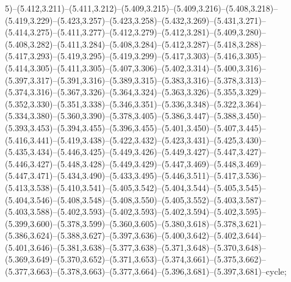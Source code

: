 5)--(5.412,3.211)--(5.411,3.212)--(5.409,3.215)--(5.409,3.216)--(5.408,3.218)--(5.419,3.229)--(5.423,3.257)--(5.423,3.258)--(5.432,3.269)--(5.431,3.271)--(5.414,3.275)--(5.411,3.277)--(5.412,3.279)--(5.412,3.281)--(5.409,3.280)--(5.408,3.282)--(5.411,3.284)--(5.408,3.284)--(5.412,3.287)--(5.418,3.288)--(5.417,3.293)--(5.419,3.295)--(5.419,3.299)--(5.417,3.303)--(5.416,3.305)--(5.414,3.305)--(5.411,3.305)--(5.407,3.306)--(5.402,3.314)--(5.400,3.316)--(5.397,3.317)--(5.391,3.316)--(5.389,3.315)--(5.383,3.316)--(5.378,3.313)--(5.374,3.316)--(5.367,3.326)--(5.364,3.324)--(5.363,3.326)--(5.355,3.329)--(5.352,3.330)--(5.351,3.338)--(5.346,3.351)--(5.336,3.348)--(5.322,3.364)--(5.334,3.380)--(5.360,3.390)--(5.378,3.405)--(5.386,3.447)--(5.388,3.450)--(5.393,3.453)--(5.394,3.455)--(5.396,3.455)--(5.401,3.450)--(5.407,3.445)--(5.416,3.441)--(5.419,3.438)--(5.422,3.432)--(5.423,3.431)--(5.425,3.430)--(5.435,3.434)--(5.446,3.425)--(5.449,3.426)--(5.449,3.427)--(5.447,3.427)--(5.446,3.427)--(5.448,3.428)--(5.449,3.429)--(5.447,3.469)--(5.448,3.469)--(5.447,3.471)--(5.434,3.490)--(5.433,3.495)--(5.446,3.511)--(5.417,3.536)--(5.413,3.538)--(5.410,3.541)--(5.405,3.542)--(5.404,3.544)--(5.405,3.545)--(5.404,3.546)--(5.408,3.548)--(5.408,3.550)--(5.405,3.552)--(5.403,3.587)--(5.403,3.588)--(5.402,3.593)--(5.402,3.593)--(5.402,3.594)--(5.402,3.595)--(5.399,3.600)--(5.378,3.599)--(5.360,3.605)--(5.380,3.618)--(5.378,3.621)--(5.386,3.624)--(5.388,3.627)--(5.397,3.636)--(5.400,3.642)--(5.402,3.644)--(5.401,3.646)--(5.381,3.638)--(5.377,3.638)--(5.371,3.648)--(5.370,3.648)--(5.369,3.649)--(5.370,3.652)--(5.371,3.653)--(5.374,3.661)--(5.375,3.662)--(5.377,3.663)--(5.378,3.663)--(5.377,3.664)--(5.396,3.681)--(5.397,3.681)--cycle;
